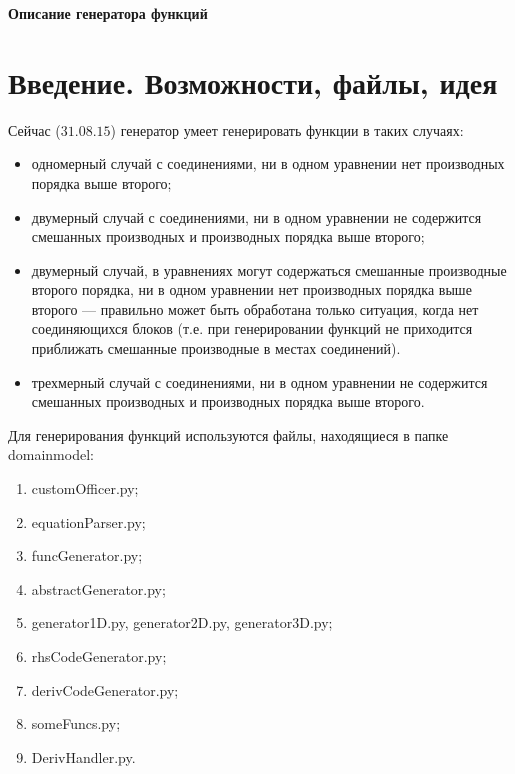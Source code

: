 \documentclass[a4paper]{article}
\begin{document}
\begin{center}
{\Huge \bf Описание генератора функций}
\end{center}

\tableofcontents
\newpage

\large
\section*{\LARGE Введение. Возможности, файлы, идея}
Сейчас ($31.08.15$)  генератор умеет генерировать функции в таких случаях:
\begin{itemize}
\item одномерный случай с соединениями, ни в одном уравнении нет про\-из\-вод\-ных порядка выше второго;
\item двумерный случай с соединениями, ни в одном уравнении не со\-дер\-жит\-ся сме\-шан\-ных производных и производных порядка выше второго;
\item двумерный случай, в уравнениях могут содержаться смешанные про\-из\-вод\-ные второго порядка, ни в одном уравнении нет производных порядка выше второго --- правильно может быть обработана только ситуация, когда нет соединяющихся блоков (т.е. при генерировании функций не приходится приближать смешанные производные в мес\-тах соединений).
\item трехмерный случай с соединениями,  ни в одном уравнении не со\-дер\-жит\-ся сме\-шан\-ных производных и производных порядка выше второго.
\end{itemize}

Для генерирования функций используются файлы, находящиеся в пап\-ке domainmodel:
\begin{enumerate}
\item  customOfficer.py; \label{i1}
\item equationParser.py; \label{i2}
\item funcGenerator.py; \label{i3}
\item abstractGenerator.py; \label{i9}
\item generator1D.py, generator2D.py, generator3D.py; \label{i8}
\item  rhsCodeGenerator.py; \label{i4}
\item derivCodeGenerator.py; \label{i5}
\item someFuncs.py; \label{i6}
\item DerivHandler.py. \label{i7}
\end{enumerate}
\end{document}
